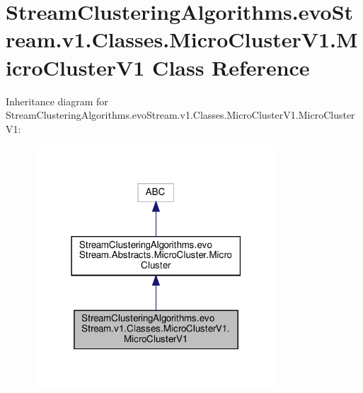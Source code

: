 \hypertarget{classStreamClusteringAlgorithms_1_1evoStream_1_1v1_1_1Classes_1_1MicroClusterV1_1_1MicroClusterV1}{}\section{Stream\+Clustering\+Algorithms.\+evo\+Stream.\+v1.\+Classes.\+Micro\+Cluster\+V1.\+Micro\+Cluster\+V1 Class Reference}
\label{classStreamClusteringAlgorithms_1_1evoStream_1_1v1_1_1Classes_1_1MicroClusterV1_1_1MicroClusterV1}


Inheritance diagram for Stream\+Clustering\+Algorithms.\+evo\+Stream.\+v1.\+Classes.\+Micro\+Cluster\+V1.\+Micro\+Cluster\+V1\+:\nopagebreak
\begin{figure}[H]
\begin{center}
\leavevmode
\includegraphics[width=259pt]{classStreamClusteringAlgorithms_1_1evoStream_1_1v1_1_1Classes_1_1MicroClusterV1_1_1MicroClusterV1__inherit__graph}
\end{center}
\end{figure}


